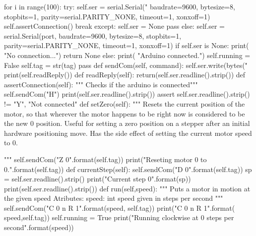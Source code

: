 \begin{python}
            for i in range(100):
                try:
                    self.ser = serial.Serial("%
                                             baudrate=9600,
                                             bytesize=8,
                                             stopbits=1,
                                             parity=serial.PARITY_NONE,
                                             timeout=1,
                                             xonxoff=1)
                    self.assertConnection()
                    break
                except:
                    self.ser = None
                    pass
        else:
            self.ser = serial.Serial(port,
                                             baudrate=9600,
                                             bytesize=8,
                                             stopbits=1,
                                             parity=serial.PARITY_NONE,
                                             timeout=1,
                                             xonxoff=1)
        if self.ser is None:
            print( "No connection...")
            return None
        else:
            print( "Arduino connected.")
            self.running = False
            self.tag = str(tag)
            pass
    def sendCom(self, command):
        self.ser.write(bytes("%
        print(self.readReply())
    def readReply(self):
        return(self.ser.readline().strip())
    def assertConnection(self):
        """ Checks if the arduino is connected"""
        self.sendCom("H")
        print(self.ser.readline().strip())
        assert self.ser.readline().strip() != "Y", "Not connected"
    def setZero(self):    
        """ Resets the current position of the motor, so that wherever
        the motor happens to be right now is considered to be the new 0
        position. Useful for setting a zero position on a stepper after
        an initial hardware positioning move. Has the side effect of
        setting the current motor speed to 0.
        
        """
        self.sendCom("Z {0}".format(self.tag))
        print("Reseting motor {0} to 0.".format(self.tag))
    def currentStep(self):
        self.sendCom("D {0}".format(self.tag))
        sp = self.ser.readline().strip()
        print("Current step {0}".format(sp))
        print(self.ser.readline().strip())
    def run(self,speed):
        """ Puts a motor in motion at the given speed 
        Atributes:
            speed: int speed given in steps per second
        """
        self.sendCom("C {0} n R {1}".format(speed, self.tag))
        print("C {0} n R {1}".format( speed,self.tag))
        self.running = True
        print("Running clockwise at {0} steps per second".format(speed))
        

\end{python}
